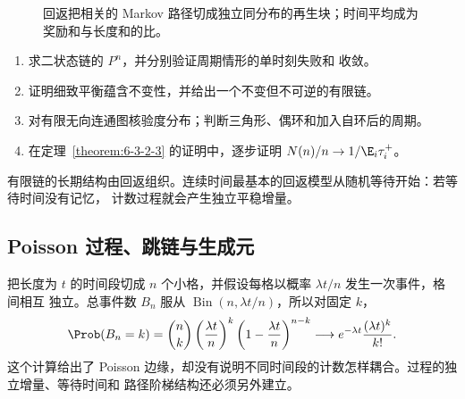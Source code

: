 \begin{figure}[htbp]
\centering
{}
\caption{回返把相关的 Markov 路径切成独立同分布的再生块；时间平均成为奖励和与长度和的比。}
\label{fig:6-3-2-regeneration}
\end{figure}

\begin{exercise}
\begin{enumerate}
 \item 求二状态链的 $P^n$，并分别验证周期情形的单时刻失败和 \Cesaro{} 收敛。
 \item 证明细致平衡蕴含不变性，并给出一个不变但不可逆的有限链。
 \item 对有限无向连通图核验度分布；判断三角形、偶环和加入自环后的周期。
 \item 在定理~\ref{theorem:6-3-2-3} 的证明中，逐步证明
 $N(n)/n\to1/\E_i\tau_i^+$。
\end{enumerate}
\end{exercise}

有限链的长期结构由回返组织。连续时间最基本的回返模型从随机等待开始：若等待时间没有记忆，
计数过程就会产生独立平稳增量。

\subsection{Poisson 过程、跳链与生成元}\label{subsec:6-3-3}

\begin{example}[稀有 Bernoulli 极限]\label{ex:6-3-3-1}
把长度为 $t$ 的时间段切成 $n$ 个小格，并假设每格以概率 $\lambda t/n$ 发生一次事件，格间相互
独立。总事件数 $B_n$ 服从 $\operatorname{Bin}(n,\lambda t/n)$，所以对固定 $k$，
\[
 \Prob(B_n=k)
 =\binom nk\left(\frac{\lambda t}{n}\right)^k
  \left(1-\frac{\lambda t}{n}\right)^{n-k}
 \longrightarrow e^{-\lambda t}\frac{(\lambda t)^k}{k!}.
\]
这个计算给出了 Poisson 边缘，却没有说明不同时间段的计数怎样耦合。过程的独立增量、等待时间和
路径阶梯结构还必须另外建立。
\end{example}

